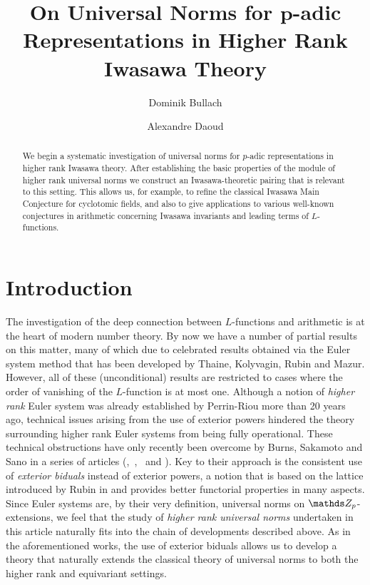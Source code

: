 \documentclass[a4paper, 
headsepline=off, DIV=12, titlepage=false]{scrartcl}
\title{\vspace{-4em}On Universal Norms for $\bm{p}$-adic Representations in Higher Rank Iwasawa Theory}
\date{}
\author{Dominik Bullach \and Alexandre Daoud\vspace{-2em}}
\begin{document}
\maketitle

\begin{abstract}
    We begin a systematic investigation of universal norms for $p$-adic representations in higher rank Iwasawa theory. After establishing the basic properties of the module of higher rank universal norms we construct an Iwasawa-theoretic pairing that is relevant to this setting. This allows us, for example, to refine the classical Iwasawa Main Conjecture for cyclotomic fields, and also to give applications to various well-known conjectures in arithmetic concerning Iwasawa invariants and leading terms of $L$-functions. 
\end{abstract}





\let\thefootnote\relax{}


\tableofcontents

\section{Introduction}
\pagestyle{special}

The investigation of the deep connection between $L$-functions and arithmetic is at the heart of modern number theory. By now we have a number of partial results on this matter, many of which due to celebrated results obtained via the Euler system method that has been developed by Thaine, Kolyvagin, Rubin and Mazur.\\
However, all of these (unconditional) results are restricted to cases where the order of vanishing of the $L$-function is at most one. Although a notion of \textit{higher rank} Euler system was already established by Perrin-Riou more than 20 years ago, technical issues arising from the use of exterior powers 
hindered the theory surrounding higher rank Euler systems from being fully operational. These technical obstructions have only recently been overcome by Burns, Sakamoto and Sano in a series of articles (\cite{EulerSystemsSagaI},\ \cite{EulerSystemsSagaII},\ \cite{EulerSystemsSagaIII} and \cite{EulerSystemsSagaIV})\@. Key to their approach is the consistent use of \textit{exterior biduals} instead of exterior powers, a notion that is based on the lattice introduced by Rubin in \cite[\S 1.2]{Rubin96} and provides better functorial properties in many aspects.\\
Since Euler systems are, by their very definition, universal norms on $\ZZ_p$-extensions, we feel that the study of \textit{higher rank universal norms} 
undertaken in this article naturally fits into the chain of developments described above. As in the aforementioned works, the use of exterior biduals allows us to develop a theory that naturally extends the classical theory of universal norms to both the higher rank and equivariant settings. 
\end{document}
